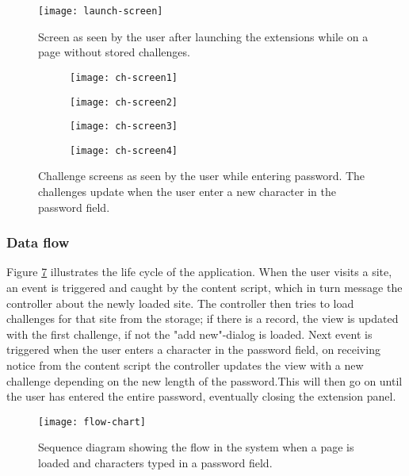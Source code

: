 \begin{figure}
    \centering
    \texttt{[image: launch-screen]} 
    \caption{Screen as seen by the user after launching the extensions while on a page without stored challenges.}
    \label{launch-screen}
\end{figure}

\begin{figure}
    \centering
    \begin{subfigure}[t]{0.45\textwidth}
        \centering
        \texttt{[image: ch-screen1]} 
        \caption{}
        \label{challenge-screen1}
    \end{subfigure}
    \hfill
    \begin{subfigure}[t]{0.45\textwidth}
        \centering
        \texttt{[image: ch-screen2]} 
        \caption{}
        \label{challenge-screen2}
    \end{subfigure}
    \hfill
    \begin{subfigure}[t]{0.45\textwidth}
        \centering
        \texttt{[image: ch-screen3]} 
        \caption{}
        \label{challenge-screen2}
    \end{subfigure}
    \hfill
    \begin{subfigure}[t]{0.45\textwidth}
        \centering
        \texttt{[image: ch-screen4]} 
        \caption{}
        \label{challenge-screen2}
    \end{subfigure}
    \caption{Challenge screens as seen by the user while entering password. The challenges update when the user enter a new character in the password field.}
    \label{ch-screens}
\end{figure}

\newpage

\subsubsection{Data flow}\label{data-flow}
Figure \ref{flow-chart} illustrates the life cycle of the application. When the user visits a site, an event is triggered and caught by the content script, which in turn message the controller about the newly loaded site. The controller then tries to load challenges for that site from the storage; if there is a record, the view is updated with the first challenge, if not the "add new"-dialog is loaded. Next event is triggered when the user enters a character in the password field, on receiving notice from the content script the controller updates the view with a new challenge depending on the new length of the password.This will then go on until the user has entered the entire password, eventually closing the extension panel.
\begin{figure}
    \centering
    \texttt{[image: flow-chart]} 
    \caption{Sequence diagram showing the flow in the system when a page is loaded and characters typed in a password field.}
    \label{flow-chart}
\end{figure}

